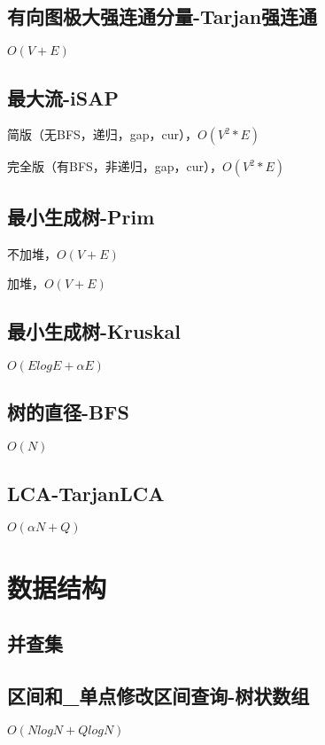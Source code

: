 \documentclass[10pt]{article}
\begin{document}
\subsection{有向图极大强连通分量-Tarjan强连通}
$O(V+E)$


\subsection{最大流-iSAP}
简版（无BFS，递归，gap，cur），$O(V^2*E)$

完全版（有BFS，非递归，gap，cur），$O(V^2*E)$


\subsection{最小生成树-Prim}
不加堆，$O(V+E)$

加堆，$O(V+E)$


\subsection{最小生成树-Kruskal}
$O(ElogE+αE)$


\subsection{树的直径-BFS}
$O(N)$


\subsection{LCA-TarjanLCA}
$O(αN+Q)$

\section{数据结构}
\subsection{并查集}


\subsection{区间和\_单点修改区间查询-树状数组}
$O(NlogN+QlogN)$

\end{document}
